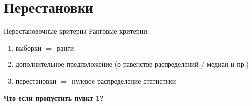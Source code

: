 \documentclass[9pt,pdf,utf8,hyperref={unicode},aspectratio=169]{beamer}
\begin{document}
\section{Перестановки}
\begin{frame}{Перестановочные критерии}
	Ранговые критерии: 
	\begin{enumerate}
		\item выборки $\Rightarrow$ ранги 
        \bigskip
		\item дополнительное предположение (о равенстве распределений / медиан и пр.)
        \bigskip
		\item перестановки  $\Rightarrow$ нулевое распределение статистики
	\end{enumerate}
	
	\bigskip
	
	\textbf{Что если пропустить пункт 1?}
\end{frame}
\end{document}
